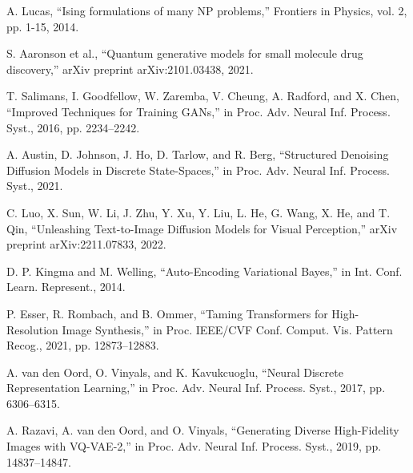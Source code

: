 \documentclass[10pt,twocolumn,letterpaper]{article}
\begin{document}
{\begin{thebibliography}{00}
 A. Lucas, ``Ising formulations of many NP problems,'' Frontiers in Physics, vol. 2, pp. 1-15, 2014.

 S. Aaronson et al., ``Quantum generative models for small molecule drug discovery,'' arXiv preprint arXiv:2101.03438, 2021.

 T. Salimans, I. Goodfellow, W. Zaremba, V. Cheung, A. Radford, and X. Chen, ``Improved Techniques for Training GANs,'' in Proc. Adv. Neural Inf. Process. Syst., 2016, pp. 2234–2242.

 A. Austin, D. Johnson, J. Ho, D. Tarlow, and R. Berg, ``Structured Denoising Diffusion Models in Discrete State-Spaces,'' in Proc. Adv. Neural Inf. Process. Syst., 2021.

 C. Luo, X. Sun, W. Li, J. Zhu, Y. Xu, Y. Liu, L. He, G. Wang, X. He, and T. Qin, ``Unleashing Text-to-Image Diffusion Models for Visual Perception,'' arXiv preprint arXiv:2211.07833, 2022.

 D. P. Kingma and M. Welling, ``Auto-Encoding Variational Bayes,'' in Int. Conf. Learn. Represent., 2014.

 P. Esser, R. Rombach, and B. Ommer, ``Taming Transformers for High-Resolution Image Synthesis,'' in Proc. IEEE/CVF Conf. Comput. Vis. Pattern Recog., 2021, pp. 12873–12883.

 A. van den Oord, O. Vinyals, and K. Kavukcuoglu, ``Neural Discrete Representation Learning,'' in Proc. Adv. Neural Inf. Process. Syst., 2017, pp. 6306–6315.

 A. Razavi, A. van den Oord, and O. Vinyals, ``Generating Diverse High-Fidelity Images with VQ-VAE-2,'' in Proc. Adv. Neural Inf. Process. Syst., 2019, pp. 14837–14847.

\end{thebibliography}
}
\end{document}

